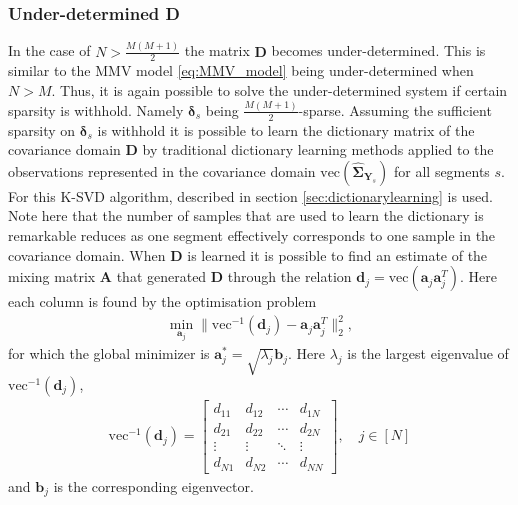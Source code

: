 \subsubsection*{Under-determined \textbf{D}}
In the case of $N > \frac{M(M+1)}{2}$ the matrix $\textbf{D}$ becomes under-determined. 
This is similar to the MMV model \eqref{eq:MMV_model} being under-determined when $N > M$. 
Thus, it is again possible to solve the under-determined system if certain sparsity is withhold. 
Namely $\boldsymbol{\delta}_s$ being $\frac{M(M+1)}{2}$-sparse.
Assuming the sufficient sparsity on $\boldsymbol{\delta}_s$ is withhold it is possible to learn the dictionary matrix of the covariance domain $\mathbf{D}$ by traditional dictionary learning methods applied to the observations represented in the covariance domain $\text{vec}(\widehat{\boldsymbol{\Sigma}}_{\mathbf{Y}_s})$ for all segments $s$.
For this K-SVD algorithm, described in section \ref{sec:dictionarylearning} is used. 
Note here that the number of samples that are used to learn the dictionary is remarkable reduces as one segment effectively corresponds to one sample in the covariance domain.  
When $\mathbf{D}$ is learned it is possible to find an estimate of the mixing matrix $\mathbf{A}$ that generated $\textbf{D}$ through the relation $\mathbf{d}_j = \text{vec}(\mathbf{a}_j \mathbf{a}_j^T)$. Here each column is found by the optimisation problem 
\begin{align*}
\min_{\textbf{a}_j} \| \text{vec}^{-1}(\textbf{d}_j) -\textbf{a}_j\textbf{a}_j^T\|_2^2, 
\end{align*}
for which the global minimizer is $\mathbf{a}^{\ast}_j=\sqrt{\lambda_j} \textbf{b}_j$. Here $\lambda_j$ is the largest eigenvalue of $\text{vec}^{-1}(\textbf{d}_j)$,
\begin{align*}
\text{vec}^{-1}(\textbf{d}_j) = 
\begin{bmatrix}
d_{11} & d_{12} & \cdots & d_{1N} \\
d_{21} & d_{22} & \cdots & d_{2N} \\
\vdots & \vdots & \ddots & \vdots \\
d_{N1} & d_{N2} & \cdots & d_{NN}
\end{bmatrix}, \quad j \in [N]
\end{align*}
and $\textbf{b}_j$ is the corresponding eigenvector.


